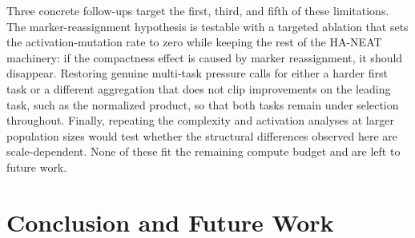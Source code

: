 \documentclass[12pt]{article}
\begin{document}
Three concrete follow-ups target the first, third, and fifth of these limitations.
The marker-reassignment hypothesis is testable with a targeted ablation that sets the activation-mutation rate to zero while keeping the rest of the HA-NEAT machinery: if the compactness effect is caused by marker reassignment, it should disappear.
Restoring genuine multi-task pressure calls for either a harder first task or a different aggregation that does not clip improvements on the leading task, such as the normalized product, so that both tasks remain under selection throughout.
Finally, repeating the complexity and activation analyses at larger population sizes would test whether the structural differences observed here are scale-dependent.
None of these fit the remaining compute budget and are left to future work.




\section{Conclusion and Future Work}
\label{sec:conclusion-and-future-work}


\clearpage \printbibliography
\end{document}
